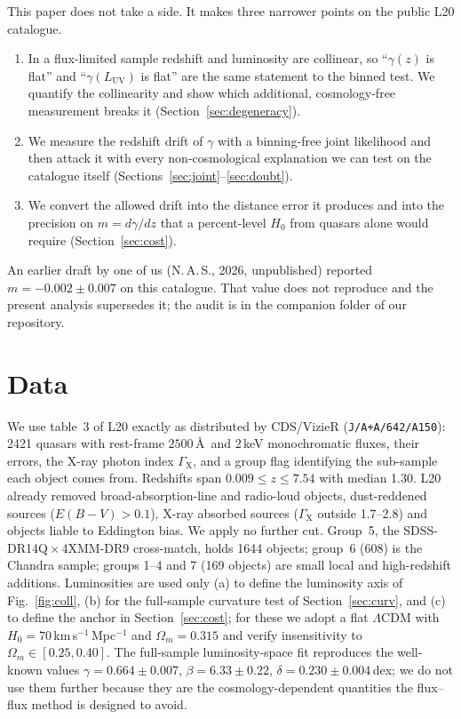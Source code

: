 \documentclass[twocolumn,10pt]{article}
\newcommand{\LUV}{L_{\mathrm{UV}}}
\begin{document}
This paper does not take a side. It makes three narrower points on the public L20 catalogue.
\begin{enumerate}\setlength{\itemsep}{0pt}
\item In a flux-limited sample redshift and luminosity are collinear, so ``$\gamma(z)$ is flat'' and ``$\gamma(\LUV)$ is flat'' are the same statement to the binned test. We quantify the collinearity and show which additional, cosmology-free measurement breaks it (Section~\ref{sec:degeneracy}).
\item We measure the redshift drift of $\gamma$ with a binning-free joint likelihood and then attack it with every non-cosmological explanation we can test on the catalogue itself (Sections~\ref{sec:joint}--\ref{sec:doubt}).
\item We convert the allowed drift into the distance error it produces and into the precision on $m=d\gamma/dz$ that a percent-level $H_0$ from quasars alone would require (Section~\ref{sec:cost}).
\end{enumerate}
An earlier draft by one of us (N.\,A.\,S., 2026, unpublished) reported $m=-0.002\pm0.007$ on this catalogue. That value does not reproduce and the present analysis supersedes it; the audit is in the companion folder of our repository.

\section{Data}
\label{sec:data}
We use table~3 of L20 exactly as distributed by CDS/VizieR (\texttt{J/A+A/642/A150}): 2421 quasars with rest-frame $2500$\,\AA\ and 2\,keV monochromatic fluxes, their errors, the X-ray photon index $\Gamma_{\mathrm{X}}$, and a group flag identifying the sub-sample each object comes from. Redshifts span $0.009\le z\le7.54$ with median 1.30. L20 already removed broad-absorption-line and radio-loud objects, dust-reddened sources ($E(B-V)>0.1$), X-ray absorbed sources ($\Gamma_{\mathrm{X}}$ outside 1.7--2.8) and objects liable to Eddington bias. We apply no further cut. Group~5, the SDSS-DR14Q\,$\times$\,4XMM-DR9 cross-match, holds 1644 objects; group~6 (608) is the Chandra sample; groups 1--4 and 7 (169 objects) are small local and high-redshift additions. Luminosities are used only (a) to define the luminosity axis of Fig.~\ref{fig:coll}, (b) for the full-sample curvature test of Section~\ref{sec:curv}, and (c) to define the anchor in Section~\ref{sec:cost}; for these we adopt a flat $\Lambda$CDM with $H_0=70$\,km\,s$^{-1}$\,Mpc$^{-1}$ and $\Omega_m=0.315$ and verify insensitivity to $\Omega_m\in[0.25,0.40]$. The full-sample luminosity-space fit reproduces the well-known values $\gamma=0.664\pm0.007$, $\beta=6.33\pm0.22$, $\delta=0.230\pm0.004$\,dex; we do not use them further because they are the cosmology-dependent quantities the flux--flux method is designed to avoid.
\end{document}
